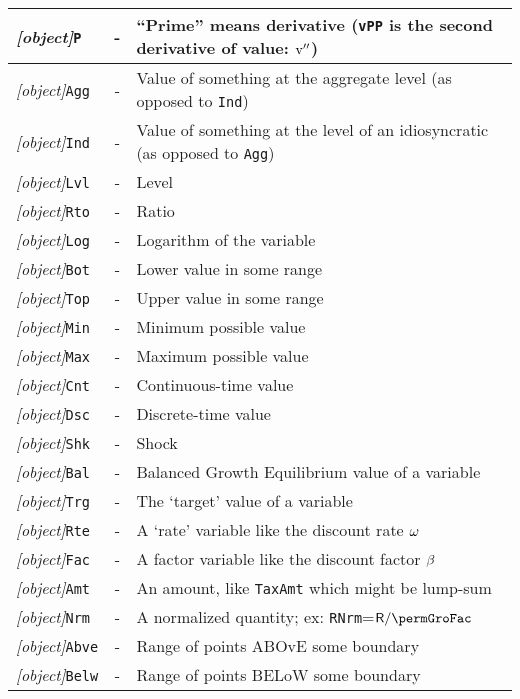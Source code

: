 \documentclass[12pt]{\econtex}
\begin{document}
\begin{table}[ht]
  \centering
  \begin{tabular}{|>{\ttfamily}lcl|}
    \hline
 \textit{[object]}\texttt{P} & - & ``Prime'' means derivative (\texttt{vPP} is the second derivative of value: $\mathrm{v}^{\prime\prime}$)
\\    \hline
    \textit{[object]}\texttt{Agg} & - & Value of something at the aggregate level (as opposed to \texttt{Ind})
    \\ \textit{[object]}\texttt{Ind} & - & Value of something at the level of an idiosyncratic (as opposed to \texttt{Agg})
    \\ \textit{[object]}\texttt{Lvl} & - & Level 
    \\ \textit{[object]}\texttt{Rto} & - & Ratio 
    \\ \textit{[object]}\texttt{Log} & - & Logarithm of the variable
    \\ \textit{[object]}\texttt{Bot} & - & Lower value in some range 
    \\ \textit{[object]}\texttt{Top} & - & Upper value in some range 
    \\ \textit{[object]}\texttt{Min} & - & Minimum possible value 
    \\ \textit{[object]}\texttt{Max} & - & Maximum possible value 
    \\ \textit{[object]}\texttt{Cnt} & - & Continuous-time value
    \\ \textit{[object]}\texttt{Dsc} & - & Discrete-time value
    \\ \textit{[object]}\texttt{Shk} & - & Shock 
    \\ \textit{[object]}\texttt{Bal} & - & Balanced Growth Equilibrium value of a variable
    \\ \textit{[object]}\texttt{Trg} & - & The `target' value of a variable 
    \\ \textit{[object]}\texttt{Rte} & - & A `rate' variable like the discount rate $\omega$
    \\ \textit{[object]}\texttt{Fac} & - & A factor variable like the discount factor $\beta$
    \\ \textit{[object]}\texttt{Amt} & - & An amount, like \texttt{TaxAmt} which might be lump-sum
    \\ \textit{[object]}\texttt{Nrm} & - & A normalized quantity; ex: \texttt{RNrm}=$\Rfree/\permGroFac$
    \\ \textit{[object]}\texttt{Abve} & - & Range of points ABOvE some boundary
    \\ \textit{[object]}\texttt{Belw} & - & Range of points BELoW some boundary

\end{tabular}
\end{table}
\end{document}
